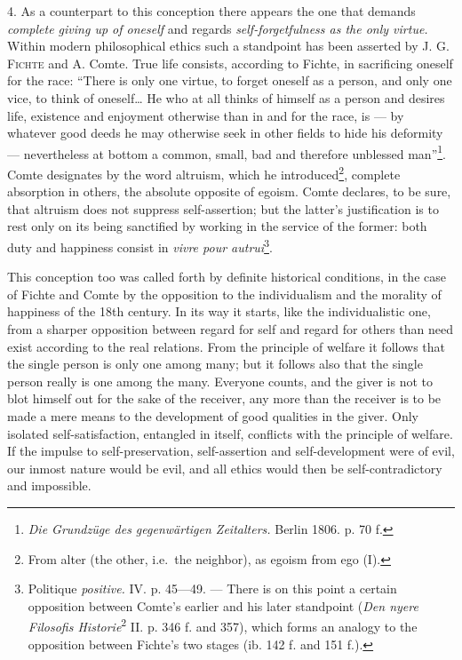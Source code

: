 \documentclass[12pt,a4paper,openany]{book}
\newcommand{\opage}[1]{\marginnote{\footnotesize\textit{[#1]}}}
\begin{document}
\opage{166}4. As a counterpart to this conception there appears the one that demands \textit{complete giving up of
oneself} and regards \textit{self-forgetfulness as the only virtue.} Within modern philosophical ethics such a
standpoint has been asserted by J. G. \textsc{Fichte} and A. Comte. True life consists, according to Fichte,
in sacrificing oneself for the race: ``There is only one virtue, to forget oneself as a person, and only one
vice, to think of oneself\dots{} He who at all thinks of himself as a person and desires life, existence and
enjoyment otherwise than in and for the race, is --- by whatever good deeds he may otherwise seek in other
fields to hide his deformity --- nevertheless at bottom a common, small, bad and therefore unblessed
man''\footnote[1]{\textit{Die Grundzüge des gegenwärtigen Zeitalters.} Berlin 1806. p. 70 f.}. Comte
designates by the word altruism, which he introduced\footnote[2]{From alter (the other, i.e.\ the
neighbor), as egoism from ego (I).}, complete absorption in others, the absolute opposite of egoism. Comte
declares, to be sure, that altruism does not suppress self-assertion; but the latter's justification is to
rest only on its being sanctified by working in the service of the former: both duty and happiness consist in
\textit{vivre pour autrui}\footnote[3]{Politique \textit{positive.} IV. p. 45---49. --- There is on this
point a certain opposition between Comte's earlier and his later standpoint (\textit{Den nyere Filosofis
Historie}\textsuperscript{2} II. p. 346 f. and 357), which forms an analogy to the opposition between Fichte's
two stages (ib. 142 f. and 151 f.).}.

This conception too was called forth by definite historical conditions, in the case of Fichte and Comte by
the opposition to the individualism and the morality of happiness of the 18th century. In its way it starts,
like the individualistic one, from a sharper opposition between regard for self and regard for others than
need exist according to the real relations. From the principle of welfare it follows that the single person
is only one among many; but it follows also that the single person really is one among the many. Everyone
counts, and the giver is not to blot himself out for the sake of the receiver, any more than the receiver is
to be made a mere means to the development of good qualities in the giver. Only isolated self-satisfaction,
entangled in itself, conflicts with the principle of welfare. If the impulse
\opage{167}to self-preservation, self-assertion and self-development were of evil, our inmost nature would be evil,
and all ethics would then be self-contradictory and impossible.
\end{document}
